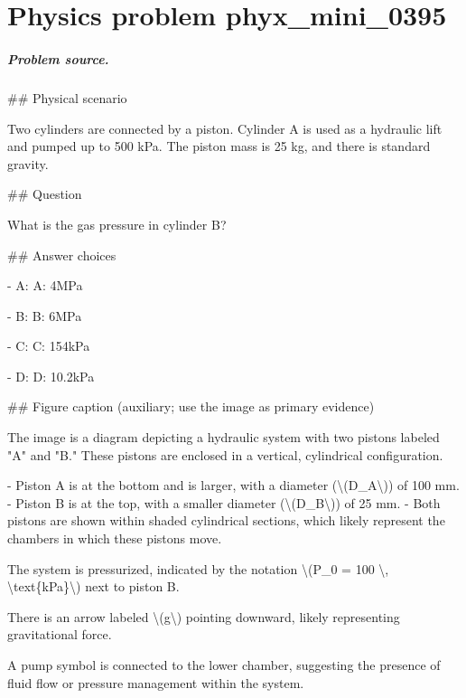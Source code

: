 
\chapter{Physics problem phyx\_mini\_0395}
\label{ch:PhyXMiniProblems_problem_phyx_mini_0395}

\paragraph{Problem source.}
\#\# Physical scenario

Two cylinders are connected by a piston. Cylinder A is used as a hydraulic lift and pumped up to 500 kPa. The piston mass is 25 kg, and there is standard gravity.

\#\# Question

What is the gas pressure in cylinder B?

\#\# Answer choices

- A: A: 4MPa

- B: B: 6MPa

- C: C: 154kPa

- D: D: 10.2kPa

\#\# Figure caption (auxiliary; use the image as primary evidence)

The image is a diagram depicting a hydraulic system with two pistons labeled "A" and "B." These pistons are enclosed in a vertical, cylindrical configuration. 

- Piston A is at the bottom and is larger, with a diameter (\textbackslash{}(D\_A\textbackslash{})) of 100 mm.
- Piston B is at the top, with a smaller diameter (\textbackslash{}(D\_B\textbackslash{})) of 25 mm.
- Both pistons are shown within shaded cylindrical sections, which likely represent the chambers in which these pistons move.

The system is pressurized, indicated by the notation \textbackslash{}(P\_0 = 100 \textbackslash{}, \textbackslash{}text\{kPa\}\textbackslash{}) next to piston B.

There is an arrow labeled \textbackslash{}(g\textbackslash{}) pointing downward, likely representing gravitational force.

A pump symbol is connected to the lower chamber, suggesting the presence of fluid flow or pressure management within the system.

